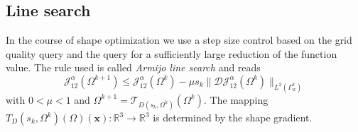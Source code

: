 \documentclass[oneside]{article}
\numberwithin{equation}{section}
\numberwithin{figure}{section}
\newcommand{\Om }{ \Omega}
\newcommand{\buu}{\boldsymbol{u}}
\newcommand{\DD }{ \mathcal{D}}
\newcommand{\JJ }{ \mathcal{J}}
\numberwithin{figure}{section}
\begin{document}
\subsection{Line search}
In the course of shape optimization we use a step size control based on the grid quality query and the query for a sufficiently large reduction of the function value. The rule used is called \textit{Armijo line search} and reads
\begin{equation}
\label{armijo1}\JJ_{12}^\alpha \left( \Om^{k+1} \right) \leq \JJ_{12}^\alpha \left( \Om^{k} \right) - \mu s_k \lVert \DD \JJ_{12}^\alpha \left( \Om^{k}  \right) \rVert_{L^2\left(\Gamma_w^k\right)} 
\end{equation}
with $0 < \mu < 1$ and $\Omega^{k+1} = \mathcal{T}_{D(s_k,\Omega^k)}(\Omega^k)$. The mapping $T_D(s_k,\Omega^k)(\Omega)(\boldsymbol{x}) :\mathbb{R}^3\to\mathbb{R}^3$ is determined by the shape gradient.
\end{document}
